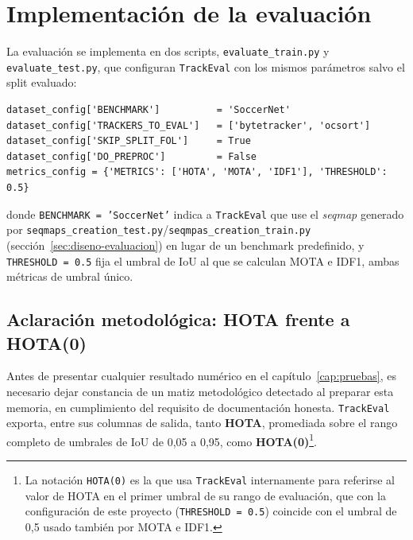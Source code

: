 \section{Implementación de la evaluación}
\label{sec:implementacion-evaluacion}

La evaluación se
implementa en dos scripts,
\texttt{evaluate\_train.py} y \texttt{evaluate\_test.py}, que configuran
\texttt{TrackEval} con los mismos parámetros salvo el split evaluado:

\begin{center}
\begin{minipage}{0.85\textwidth}
\begin{verbatim}
dataset_config['BENCHMARK']          = 'SoccerNet'
dataset_config['TRACKERS_TO_EVAL']   = ['bytetracker', 'ocsort']
dataset_config['SKIP_SPLIT_FOL']     = True
dataset_config['DO_PREPROC']         = False
metrics_config = {'METRICS': ['HOTA', 'MOTA', 'IDF1'], 'THRESHOLD': 0.5}
\end{verbatim}
\end{minipage}
\end{center}

donde \texttt{BENCHMARK = 'SoccerNet'} indica a \texttt{TrackEval} que use
el \emph{seqmap} generado por
\texttt{seqmaps\_creation\_test.py}/\texttt{seqmpas\_creation\_train.py}
(sección~\ref{sec:diseno-evaluacion}) en lugar de un benchmark predefinido,
y \texttt{THRESHOLD = 0.5} fija el umbral de IoU al que se calculan MOTA e
IDF1, ambas métricas de umbral único.

\subsection{Aclaración metodológica: HOTA frente a HOTA(0)}
\label{subsec:impl-hota-vs-hota0}

Antes de presentar cualquier resultado numérico en el
capítulo~\ref{cap:pruebas}, es necesario dejar constancia de un matiz
metodológico detectado al preparar esta memoria, en cumplimiento del
requisito de documentación honesta. \texttt{TrackEval} exporta,
entre sus columnas de salida, tanto \textbf{HOTA}, promediada sobre el
rango completo de umbrales de IoU de 0,05 a 0,95, como
\textbf{HOTA(0)}\footnote{La notación \texttt{HOTA(0)} es la que usa
\texttt{TrackEval} internamente para referirse al valor de HOTA en el
primer umbral de su rango de evaluación, que con la configuración de este
proyecto (\texttt{THRESHOLD = 0.5}) coincide con el umbral de 0,5 usado
también por MOTA e IDF1.}.

